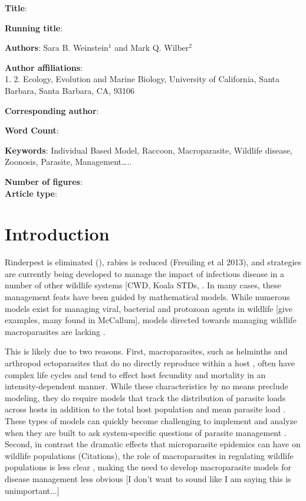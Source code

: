\documentclass[11pt]{article}
\begin{document}
\noindent
\textbf{Title}: 

\bigskip

\noindent
\textbf{Running title}: 

\bigskip

\noindent
\textbf{Authors}: Sara B. Weinstein$^1$ and Mark Q. Wilber$^2$

\bigskip

\noindent
\textbf{Author affiliations}: \\
1. 
2. Ecology, Evolution and Marine Biology, University of California, Santa Barbara, Santa Barbara, CA, 93106

\bigskip

\noindent
\textbf{Corresponding author}:

\bigskip

\noindent
\textbf{Word Count}: 

\bigskip

\noindent
\textbf{Keywords}: Individual Based Model, Raccoon, Macroparasite,
Wildlife disease, Zoonosis, Parasite, Management\ldots{}..

\bigskip

\noindent
\textbf{Number of figures}:  \\
\textbf{Article type}: 

\clearpage

\section{Introduction}

Rinderpest is eliminated (), rabies is reduced (Freuiling et al 2013), and strategies are currently being developed to manage the impact of infectious disease in a number of other wildlife systems [CWD, Koala STDs, . In many cases, these management feats have been
guided by mathematical models. While numerous models exist for managing
viral, bacterial and protozoan agents in wildlife [give examples, many found in McCallum], models directed
towards managing wildlife macroparasites are lacking \citep{McCallum2017}.

This is likely due to two reasons. First, macroparasites, such as helminths and arthropod ectoparasites that do no directly reproduce within a host \citep{AndersonandMay1979}, often have complex life cycles and tend to effect host fecundity and mortality in an intensity-dependent manner. While these characteristics by no means preclude modeling, they do require models that track the distribution of parasite loads across hosts in addition to the total host population and mean parasite load \citep{AndersonandMay1978}.  These types of models can quickly become challenging to implement and analyze when they are built to ask system-specific questions of parasite management \citep{McCallum2017}.  Second, in contrast the dramatic effects that microparasite epidemics can have on wildlife populations (Citations), the role of macroparasites in regulating wildlife populations is less clear \citep{Tompkins2002,Tompkins2011}, making the need to develop macroparasite models for disease management less obvious [I don't want to sound like I am saying this is unimportant...]
\end{document}
